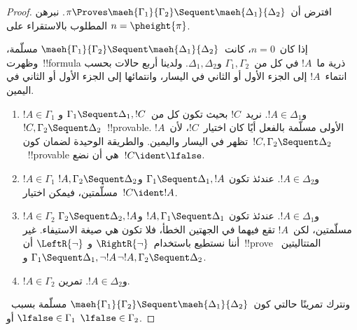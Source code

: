 \documentclass[../../../include/open-logic-section]{subfiles}
\begin{document}
\begin{proof}
  افترض أن~$\pi \Proves \maeh{\Gamma_1}{\Gamma_2} \Sequent
  \maeh{\Delta_1}{\Delta_2}$. نبرهن المطلوب بالاستقراء على
  $n=\pheight{\pi}$.

  إذا كان~$n=0$، كانت~$\maeh{\Gamma_1}{\Gamma_2} \Sequent
  \maeh{\Delta_1}{\Delta_2}$ مسلّمة، وظهرت~!!{formula} ذرية ما~$!A$
  في كل من~$\Gamma_1, \Gamma_2$ و$\Delta_1, \Delta_2$. ولدينا أربع
  حالات بحسب انتماء~$!A$ إلى الجزء الأول أو الثاني في اليسار، وانتمائها
  إلى الجزء الأول أو الثاني في اليمين.
  \begin{enumerate}
    \item $!A \in \Gamma_1$ و$!A \in \Delta_1$. نريد~$!C$ بحيث
    تكون كل من~$\Gamma_1 \Sequent \Delta_1, !C$ و$!C, \Gamma_2
    \Sequent \Delta_2$~!!{provable}. الأولى مسلّمة بالفعل أيًا كان
    اختيار~$!C$، لأن~$!A$ تظهر في اليسار واليمين. والطريقة الوحيدة
    لضمان كون~$!C, \Gamma_2 \Sequent \Delta_2$~!!{provable} هي أن
    نضع~$!C \ident \lfalse$.
    \item $!A \in \Gamma_1$ و$!A \in \Delta_2$. عندئذ تكون
    $\Gamma_1 \Sequent \Delta_1, !A$ و$!A, \Gamma_2 \Sequent
    \Delta_2$ مسلّمتين، فيمكن اختيار~$!C \ident !A$.
    \item $!A \in \Gamma_2$ و$!A \in \Delta_1$. عندئذ تكون
    $!A, \Gamma_1 \Sequent \Delta_1$ و$\Gamma_2 \Sequent \Delta_2,
    !A$ مسلّمتين، لكن~$!A$ تقع فيهما في الجهتين الخطأ، فلا تكون هي صيغة
    الاستيفاء. غير أننا نستطيع باستخدام~$\RightR{\lnot}$ و
    $\LeftR{\lnot}$ أن~!!{prove} المتتاليتين~$\Gamma_1
    \Sequent \Delta_1, \lnot!A$ و$\lnot !A, \Gamma_2 \Sequent
    \Delta_2$.
    \item $!A \in \Gamma_2$ و$!A \in \Delta_2$. تمرين.
  \end{enumerate}
  ونترك تمرينًا حالتي كون~$\maeh{\Gamma_1}{\Gamma_2} \Sequent
  \maeh{\Delta_1}{\Delta_2}$ مسلّمة بسبب~$\lfalse \in \Gamma_1$ أو
  $\lfalse \in \Gamma_2$.


\end{proof}
\end{document}
